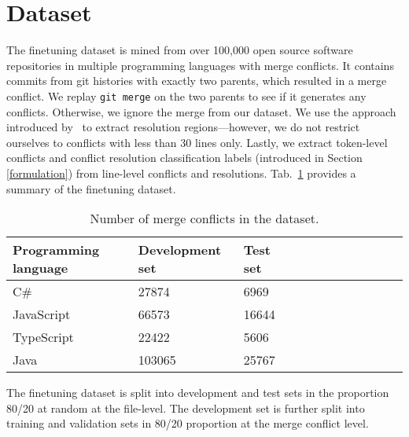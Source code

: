 \section{Dataset}
\label{sec:dataset}

The finetuning dataset is mined from over 100,000 open source software repositories in multiple programming languages with merge conflicts. It contains commits from git histories with exactly two parents, which resulted in a merge conflict.  We replay \texttt{git merge} on the two parents to see if it generates any conflicts. Otherwise, we ignore the merge from our dataset. We use the approach introduced by~\citet{Dinella2021} to extract resolution regions---however, we do not restrict ourselves to conflicts with less than 30 lines only.  Lastly, we extract token-level conflicts and conflict resolution classification labels (introduced in Section \ref{formulation}) from line-level conflicts and resolutions. Tab.~\ref{tab:fintuning_dataset} provides a summary of the finetuning dataset.

\begin{table}[htb]
\centering
\caption{Number of merge conflicts in the dataset.}
\begin{tabular}{llllllllllll} \toprule
\textbf{Programming language} & \textbf{Development set}  & \textbf{Test set} \\ \midrule
C\# & 27874 & 6969 \\ 
JavaScript & 66573 & 16644\\ 
TypeScript & 22422 & 5606\\ 
Java & 103065 & 25767 \\ 
\bottomrule
\end{tabular}
\label{tab:fintuning_dataset}
\end{table}
The finetuning dataset is split into development and test sets in the proportion 80/20 at random at the file-level. The development set is further split into training and validation sets in 80/20 proportion at the merge conflict level.    
